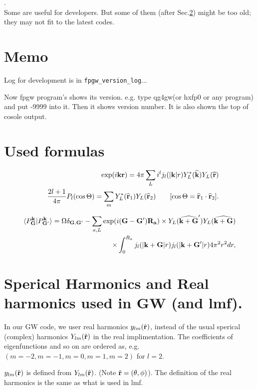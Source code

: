 \documentclass[a4paper,10pt,epsf,fleqn]{article}
\newcommand{\raw}[1]{{\tt #1}}
\begin{document}
\newpage
{}.  \\Some are useful for developers. But some of them 
(after Sec.\ref{usedf}) might be too old; 
they may not fit to the latest codes.


\appendix
\section{Memo}
\noindent * Log for development is in \raw{fpgw\_version\_log}...

\noindent * Now fpgw program's shows its version.
e.g. type qg4gw(or hxfp0 or any program)  and put -9999 into it. 
Then it shows version number. It is also shown the top of cosole output.


\section{Used formulas}
\label{usedf}
\begin{eqnarray}
&&\exp( i {\bf k} {\bf r}) = 4 \pi \sum_L i^l 
j_l(|{\bf k}|r)  Y^*_L( {\bf \widehat{ k} }) Y_L(\widehat{{\bf r}}) \\
&&\frac{2l+1}{4 \pi} P_l(\cos\Theta) = \sum_m Y^*_L( {\bf \widehat{r}}_1) 
Y_L({\bf \widehat{r}}_2) \ \ \ \ \ \ 
[\cos \Theta = {\bf \widehat{r}}_1 \cdot {\bf \widehat{r}}_2].
\end{eqnarray}

\begin{eqnarray}
\langle P^{\bf k}_{\bf G}|P^{\bf k}_{{\bf G}'} \rangle
= \Omega \delta_{{\bf G},{\bf G}'} -  
\sum_{a,L} \exp( i ({\bf G}-{\bf G}') {\bf R_a}) \times Y_L(\widehat{{\bf k+G}}') 
Y_L( {\bf \widehat{ k+G} }) \nonumber \\
\times \int_0^{R_a} j_l(|{\bf k+G}|r)j_l(|{\bf k+G}'|r) 4 \pi^2 r^2 dr,
\end{eqnarray}

\newpage
\section{Sperical Harmonics and Real harmonics used in GW (and lmf).}

In our GW code, we user real harmonics $y_{lm}(\hat{\bf r})$,
instead of the usual sperical (complex) harmonics $Y_{lm}(\hat{\bf r})$
in the real implimentation.
The coefficients of eigenfunctions and so on are ordered as, e.g.
$(m=-2, m=-1, m=0, m=1,m=2)$ for $l=2$.

$y_{lm}(\hat{\bf r})$ is defined from $Y_{lm}(\hat{\bf r})$.
(Note $\hat{\bf r}=(\theta, \phi)$). The definition of the 
real harmonics is the same as what is used in lmf.
\end{document}
